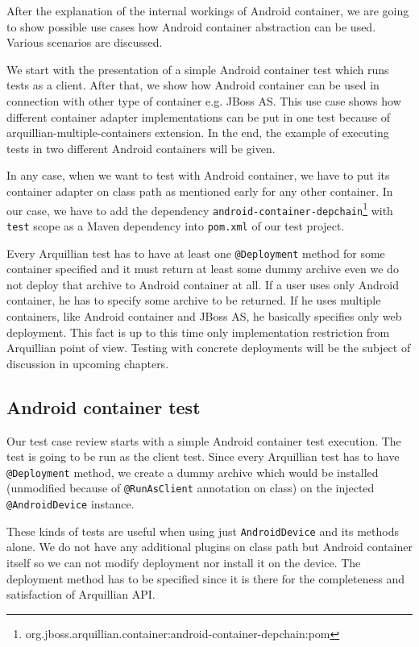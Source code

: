 \documentclass[12pt,final,oneside]{fithesis}
\begin{document}
After the explanation of the internal workings of Android container, we are going to show possible use cases how Android container abstraction can be used. Various scenarios are discussed.

We start with the presentation of a simple Android container test which runs tests as a client. After that, we show how Android container can be used in connection with other type of container e.g. JBoss AS. This use case shows how different container adapter implementations can be put in one test because of arquillian-multiple-containers extension. In the end, the example of executing tests in two different Android containers will be given.

In any case, when we want to test with Android container, we have to put its container adapter on class path as mentioned early for any other container. In our case, we have to add the dependency \texttt{android-container-depchain}\footnote{org.jboss.arquillian.container:android-container-depchain:pom} with \texttt{test} scope as a Maven dependency into \texttt{pom.xml} of our test project.

Every Arquillian test has to have at least one \texttt{@Deployment} method for some container specified and it must return at least some dummy archive even we do not deploy that archive to Android container at all. If a user uses only Android container, he has to specify some archive to be returned. If he uses multiple containers, like Android container and JBoss AS, he basically specifies only web deployment. This fact is up to this time only implementation restriction from Arquillian point of view. Testing with concrete deployments will be the subject of discussion in upcoming chapters.

		\subsection{Android container test}

Our test case review starts with a simple Android container test execution. The test is going to be run as the client test. Since every Arquillian test has to have \texttt{@Deployment} method, we create a dummy archive which would be installed (unmodified because of \texttt{@RunAsClient} annotation on class) on the injected \texttt{@AndroidDevice} instance.

These kinds of tests are useful when using just \texttt{AndroidDevice} and its methods alone. We do not have any additional plugins on class path but Android container itself so we can not modify deployment nor install it on the device. The deployment method has to be specified since it is there for the completeness and satisfaction of Arquillian API.
\end{document}
